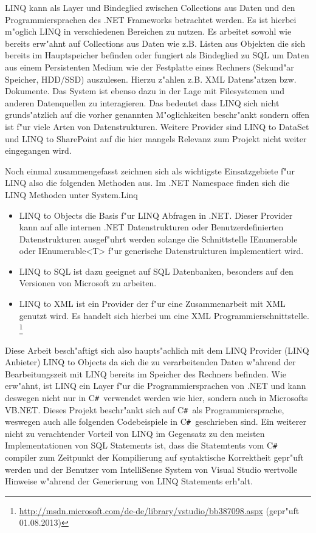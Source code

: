\documentclass[pagesize, paper=a4, fontsize=12pt,titlepage=true, headings=small, headnosepline, abstractoff, liststotoc, nochapterprefix, plainheadsepline]{scrreprt}
\newcommand{\CSS}{C\texttt{\# }}
\begin{document}
LINQ kann als Layer und Bindeglied zwischen Collections aus Daten und den Programmiersprachen des .NET Frameworks betrachtet werden. Es ist hierbei m"oglich LINQ in verschiedenen Bereichen zu nutzen. Es arbeitet sowohl wie bereits erw"ahnt auf Collections aus Daten wie z.B. Listen aus Objekten die sich bereits im Hauptspeicher befinden oder fungiert als Bindeglied zu SQL um Daten aus einem Persistenten Medium wie der Festplatte eines Rechners (Sekund"ar Speicher, HDD/SSD) auszulesen. Hierzu z"ahlen z.B. XML Datens"atzen bzw. Dokumente. Das System ist ebenso dazu in der Lage mit Filesystemen und anderen Datenquellen zu interagieren. Das bedeutet dass LINQ sich nicht grunds"atzlich auf die vorher genannten M"oglichkeiten beschr"ankt sondern offen ist f"ur viele Arten von Datenstrukturen. Weitere Provider sind LINQ to DataSet und LINQ to SharePoint auf die hier mangels Relevanz zum Projekt nicht weiter eingegangen wird.
\newline

Noch einmal zusammengefasst zeichnen sich als wichtigste Einsatzgebiete f"ur LINQ also die folgenden Methoden aus. Im .NET Namespace finden sich die LINQ Methoden unter System.Linq
\begin{itemize}
\item LINQ to Objects die Basis f"ur LINQ Abfragen in .NET. Dieser Provider kann auf alle internen .NET Datenstrukturen oder Benutzerdefinierten Datenstrukturen ausgef"uhrt werden solange die Schnittstelle IEnumerable oder IEnumerable<T> f"ur generische Datenstrukturen implementiert wird.
\item LINQ to SQL ist dazu geeignet auf SQL Datenbanken, besonders auf den Versionen von Microsoft zu arbeiten.
\item LINQ to XML ist ein Provider der f"ur eine Zusammenarbeit mit XML genutzt wird. Es handelt sich hierbei um eine XML Programmierschnittstelle. \cite{MicrosoftCReferenz.2013} \footnote{\url{http://msdn.microsoft.com/de-de/library/vstudio/bb387098.aspx} (gepr"uft 01.08.2013)}
\end{itemize}

Diese Arbeit besch"aftigt sich also haupts"achlich mit dem LINQ Provider (LINQ Anbieter) LINQ to Objects da sich die zu verarbeitenden Daten w"ahrend der Bearbeitungszeit mit LINQ bereits im Speicher des Rechners befinden. Wie erw"ahnt, ist LINQ ein Layer f"ur die Programmiersprachen von .NET und kann deswegen nicht nur in \CSS verwendet werden wie hier, sondern auch in Microsofts VB.NET. Dieses Projekt beschr"ankt sich auf \CSS als Programmiersprache, weswegen auch alle folgenden Codebeispiele in \CSS geschrieben sind. Ein weiterer nicht zu verachtender Vorteil von LINQ im Gegensatz zu den meisten Implementationen von SQL Statements ist, dass die Statemtents vom \CSS compiler zum Zeitpunkt der Kompilierung auf syntaktische Korrektheit gepr"uft werden und der Benutzer vom IntelliSense System von Visual Studio wertvolle Hinweise w"ahrend der Generierung von LINQ Statements erh"alt.
\end{document}

